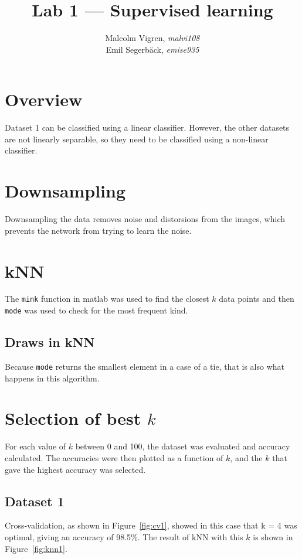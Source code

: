 \documentclass{article}
\begin{document}
\title{Lab 1 --- Supervised learning}
\author{Malcolm Vigren, \textit{malvi108} \\
        Emil Segerbäck, \textit{emise935}}

\maketitle

\section{Overview}
Dataset 1 can be classified using a linear classifier. However, the
other datasets are not linearly separable, so they need to be classified
using a non-linear classifier.

\section{Downsampling}
Downsampling the data removes noise and distorsions from the images,
which prevents the network from trying to learn the noise.

\section{kNN}
The \texttt{mink} function in matlab was used to find the closest $k$
data points and then \texttt{mode} was used to check for the most
frequent kind.

\subsection{Draws in kNN}
Because \texttt{mode} returns the smallest element in a case of a tie,
that is also what happens in this algorithm.

\section{Selection of best $k$}
For each value of $k$ between 0 and 100, the dataset was evaluated and
accuracy calculated. The accuracies were then plotted as a function
of $k$, and the $k$ that gave the highest accuracy was selected.

\subsection{Dataset 1}

Cross-validation, as shown in Figure~\ref{fig:cv1}, showed in this
case that k = 4 was optimal, giving an accuracy of 98.5\%. 
The result of kNN with this $k$ is shown in Figure~\ref{fig:knn1}.
\end{document}
